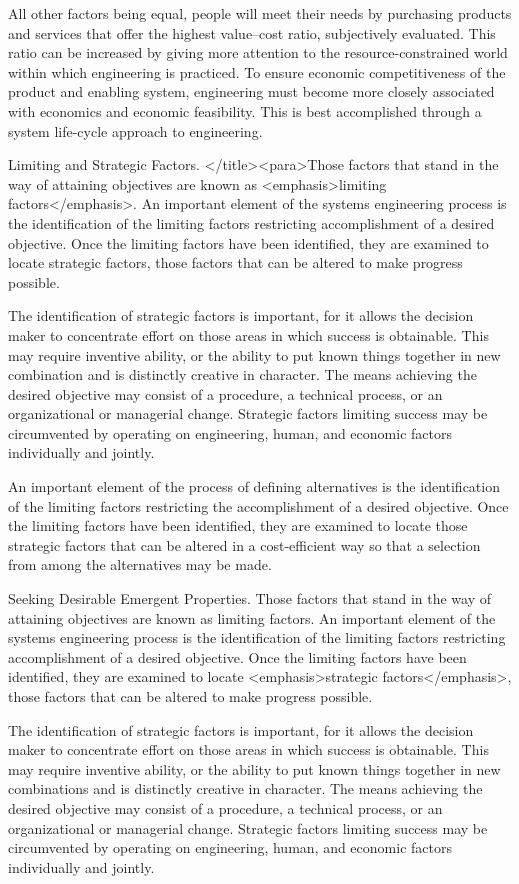 All other factors being equal, people will meet their needs by purchasing products and services that offer the highest value–cost ratio, subjectively evaluated. This ratio can be increased by giving more attention to the resource-constrained world within which engineering is practiced. To ensure economic competitiveness of the product and enabling system, engineering must become more closely associated with economics and economic feasibility. This is best accomplished through a system life-cycle approach to engineering.

Limiting and Strategic Factors. </title><para>Those factors that stand in the way of attaining objectives are known as <emphasis>limiting factors</emphasis>. An important element of the systems engineering process is the identification of the limiting factors restricting accomplishment of a desired objective. Once the limiting factors have been identified, they are examined to locate strategic factors, those factors that can be altered to make progress possible.

The identification of strategic factors is important, for it allows the decision maker to concentrate effort on those areas in which success is obtainable. This may require inventive ability, or the ability to put known things together in new combination and is distinctly creative in character. The means achieving the desired objective may consist of a procedure, a technical process, or an organizational or managerial change. Strategic factors limiting success may be circumvented by operating on engineering, human, and economic factors individually and jointly.

An important element of the process of defining alternatives is the identification of the limiting factors restricting the accomplishment of a desired objective. Once the limiting factors have been identified, they are examined to locate those strategic factors that can be altered in a cost-efficient way so that a selection from among the alternatives may be made.

Seeking Desirable Emergent Properties. Those factors that stand in the way of attaining objectives are known as limiting factors. An important element of the systems engineering process is the identification of the limiting factors restricting accomplishment of a desired objective. Once the limiting factors have been identified, they are examined to locate <emphasis>strategic factors</emphasis>, those factors that can be altered to make progress possible.

The identification of strategic factors is important, for it allows the decision maker to concentrate effort on those areas in which success is obtainable. This may require inventive ability, or the ability to put known things together in new combinations and is distinctly creative in character. The means achieving the desired objective may consist of a procedure, a technical process, or an organizational or managerial change. Strategic factors limiting success may be circumvented by operating on engineering, human, and economic factors individually and jointly.

